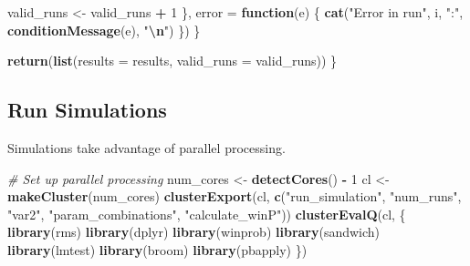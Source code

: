 \documentclass[
  letterpaper,
  DIV=11,
  numbers=noendperiod]{scrartcl}
\newenvironment{Shaded}{\begin{snugshade}}{\end{snugshade}}
\newcommand{\AttributeTok}[1]{\textcolor[rgb]{0.13,0.29,0.53}{#1}}
\newcommand{\CommentTok}[1]{\textcolor[rgb]{0.56,0.35,0.01}{\textit{#1}}}
\newcommand{\ControlFlowTok}[1]{\textcolor[rgb]{0.13,0.29,0.53}{\textbf{#1}}}
\newcommand{\DecValTok}[1]{\textcolor[rgb]{0.00,0.00,0.81}{#1}}
\newcommand{\FunctionTok}[1]{\textcolor[rgb]{0.13,0.29,0.53}{\textbf{#1}}}
\newcommand{\NormalTok}[1]{#1}
\newcommand{\OtherTok}[1]{\textcolor[rgb]{0.56,0.35,0.01}{#1}}
\newcommand{\SpecialCharTok}[1]{\textcolor[rgb]{0.81,0.36,0.00}{\textbf{#1}}}
\newcommand{\StringTok}[1]{\textcolor[rgb]{0.31,0.60,0.02}{#1}}
\begin{document}
\begin{Shaded}
\begin{Highlighting}[]
\NormalTok{      valid\_runs }\OtherTok{\textless{}{-}}\NormalTok{ valid\_runs }\SpecialCharTok{+} \DecValTok{1}
\NormalTok{    \}, }\AttributeTok{error =} \ControlFlowTok{function}\NormalTok{(e) \{}
      \FunctionTok{cat}\NormalTok{(}\StringTok{"Error in run"}\NormalTok{, i, }\StringTok{":"}\NormalTok{, }\FunctionTok{conditionMessage}\NormalTok{(e), }\StringTok{"}\SpecialCharTok{\textbackslash{}n}\StringTok{"}\NormalTok{)}
\NormalTok{    \})}
\NormalTok{  \}}
  
  \FunctionTok{return}\NormalTok{(}\FunctionTok{list}\NormalTok{(}\AttributeTok{results =}\NormalTok{ results, }\AttributeTok{valid\_runs =}\NormalTok{ valid\_runs))}
\NormalTok{\}}
\end{Highlighting}
\end{Shaded}

\subsection{Run Simulations}\label{run-simulations}

Simulations take advantage of parallel processing.

\begin{Shaded}
\begin{Highlighting}[]
\CommentTok{\# Set up parallel processing}
\NormalTok{num\_cores }\OtherTok{\textless{}{-}} \FunctionTok{detectCores}\NormalTok{() }\SpecialCharTok{{-}} \DecValTok{1}
\NormalTok{cl }\OtherTok{\textless{}{-}} \FunctionTok{makeCluster}\NormalTok{(num\_cores)}
\FunctionTok{clusterExport}\NormalTok{(cl, }\FunctionTok{c}\NormalTok{(}\StringTok{"run\_simulation"}\NormalTok{, }\StringTok{"num\_runs"}\NormalTok{, }\StringTok{"var2"}\NormalTok{, }\StringTok{"param\_combinations"}\NormalTok{, }\StringTok{"calculate\_winP"}\NormalTok{))}
\FunctionTok{clusterEvalQ}\NormalTok{(cl, \{}
  \FunctionTok{library}\NormalTok{(rms)}
  \FunctionTok{library}\NormalTok{(dplyr)}
  \FunctionTok{library}\NormalTok{(winprob)}
  \FunctionTok{library}\NormalTok{(sandwich)}
  \FunctionTok{library}\NormalTok{(lmtest)}
  \FunctionTok{library}\NormalTok{(broom)}
  \FunctionTok{library}\NormalTok{(pbapply)}
\NormalTok{\})}
\end{Highlighting}
\end{Shaded}
\end{document}
